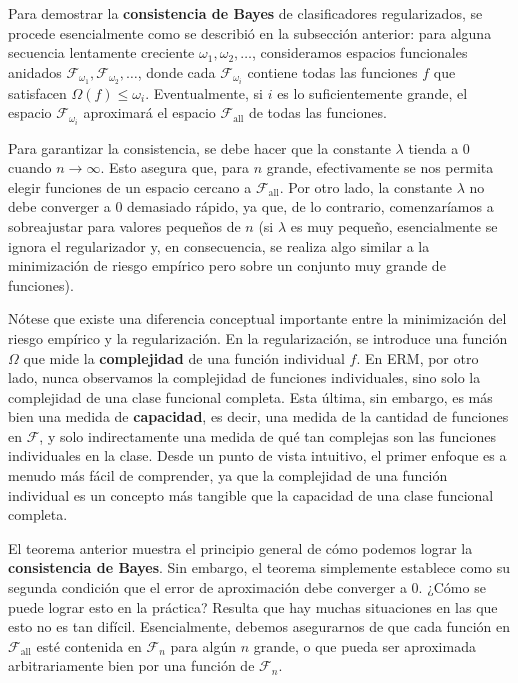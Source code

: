 \documentclass{report}
\begin{document}
Para demostrar la \textbf{consistencia de Bayes} de clasificadores regularizados, se procede esencialmente como
se describió en la subsección anterior: para alguna secuencia lentamente creciente \(\omega_1, \omega_2, \dots\),
consideramos espacios funcionales anidados \(\mathcal{F}_{\omega_1}, \mathcal{F}_{\omega_2}, \dots\), donde cada
\(\mathcal{F}_{\omega_i}\) contiene todas las funciones \(f\) que satisfacen \(\Omega(f) \leq \omega_i\).
Eventualmente, si \(i\) es lo suficientemente grande, el espacio \(\mathcal{F}_{\omega_i}\) aproximará el
espacio \(\mathcal{F}_{\text{all}}\) de todas las funciones.

Para garantizar la consistencia, se debe hacer que la constante \(\lambda\) tienda a \(0\) cuando \(n \to \infty\).
Esto asegura que, para \(n\) grande, efectivamente se nos permita elegir funciones de un espacio cercano a
\(\mathcal{F}_{\text{all}}\). Por otro lado, la constante \(\lambda\) no debe converger a \(0\) demasiado rápido,
ya que, de lo contrario, comenzaríamos a sobreajustar para valores pequeños de \(n\) (si \(\lambda\) es muy
pequeño, esencialmente se ignora el regularizador y, en consecuencia, se realiza algo similar a la minimización
de riesgo empírico pero sobre un conjunto muy grande de funciones).

Nótese que existe una diferencia conceptual importante entre la minimización del riesgo empírico y la
regularización. En la regularización, se introduce una función \(\Omega\) que mide la \textbf{complejidad} de
una función individual \(f\). En ERM, por otro lado, nunca observamos la complejidad de funciones individuales,
sino solo la complejidad de una clase funcional completa. Esta última, sin embargo, es más bien una medida de
\textbf{capacidad}, es decir, una medida de la cantidad de funciones en \(\mathcal{F}\), y solo indirectamente
una medida de qué tan complejas son las funciones individuales en la clase. Desde un punto de vista intuitivo,
el primer enfoque es a menudo más fácil de comprender, ya que la complejidad de una función individual es un
concepto más tangible que la capacidad de una clase funcional completa.

El teorema anterior muestra el principio general de cómo podemos lograr la \textbf{consistencia de Bayes}.
Sin embargo, el teorema simplemente establece como su segunda condición que el error de aproximación
debe converger a \(0\). ¿Cómo se puede lograr esto en la práctica? Resulta que hay muchas situaciones
en las que esto no es tan difícil. Esencialmente, debemos asegurarnos de que cada función en
\(\mathcal{F}_{\text{all}}\) esté contenida en \(\mathcal{F}_n\) para algún \(n\) grande, o que pueda
ser aproximada arbitrariamente bien por una función de \(\mathcal{F}_n\).
\end{document}
